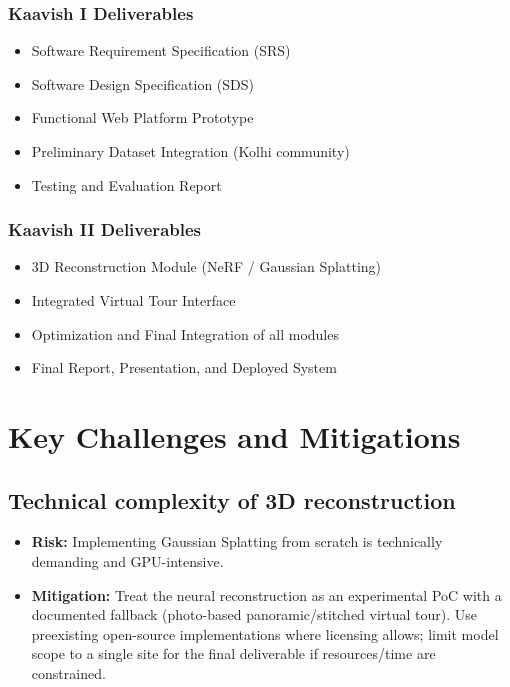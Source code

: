 \subsubsection*{Kaavish I Deliverables}

\begin{itemize}
    \item Software Requirement Specification (SRS)
    \item Software Design Specification (SDS)
    \item Functional Web Platform Prototype
    \item Preliminary Dataset Integration (Kolhi community)
    \item Testing and Evaluation Report
\end{itemize}

\subsubsection*{Kaavish II Deliverables}

\begin{itemize}
    \item 3D Reconstruction Module (NeRF / Gaussian Splatting)
    \item Integrated Virtual Tour Interface
    \item Optimization and Final Integration of all modules
    \item Final Report, Presentation, and Deployed System
\end{itemize}



\section{Key Challenges and Mitigations}

\subsection{Technical complexity of 3D reconstruction}
\begin{itemize}
  \item \textbf{Risk:} Implementing Gaussian Splatting from scratch is technically demanding and GPU-intensive.
  \item \textbf{Mitigation:} Treat the neural reconstruction as an experimental PoC with a documented fallback (photo-based panoramic/stitched virtual tour). Use preexisting open-source implementations where licensing allows; limit model scope to a single site for the final deliverable if resources/time are constrained.
\end{itemize}

